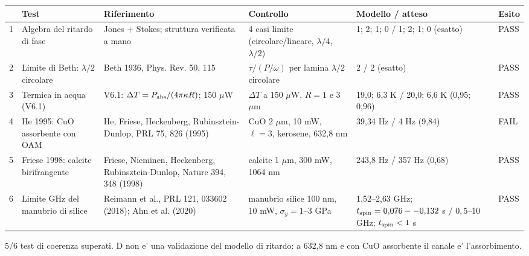 \begin{tabular}{|p{0.3cm}|p{2.4cm}|p{2.7cm}|p{3.5cm}|p{3.75cm}|p{0.85cm}|}
\hline
 & Test & Riferimento & Controllo & Modello / atteso & Esito \\
\hline
1 & Algebra del ritardo di fase & Jones + Stokes; struttura verificata a mano & 4 casi limite (circolare/lineare, $\lambda/4$, $\lambda/2$) & 1; 2; 1; 0 / 1; 2; 1; 0 (esatto) & PASS \\
\hline
2 & Limite di Beth: $\lambda/2$ circolare & Beth 1936, Phys. Rev. 50, 115 & $\tau/(P/\omega)$ per lamina $\lambda/2$ circolare & 2 / 2 (esatto) & PASS \\
\hline
3 & Termica in acqua (V6.1) & V6.1: $\Delta T=P_{\rm abs}/(4\pi\kappa R)$; 150 $\mu$W & $\Delta T$ a 150 $\mu$W, $R=1$ e 3 $\mu$m & 19{,}0; 6{,}3 K / 20{,}0; 6{,}6 K (0{,}95; 0{,}96) & PASS \\
\hline
4 & He 1995: CuO assorbente con OAM & He, Friese, Heckenberg, Rubinsztein-Dunlop, PRL 75, 826 (1995) & CuO 2 $\mu$m, 10 mW, $\ell=3$, kerosene, 632,8 nm & 39{,}34 Hz / 4 Hz (9{,}84) & FAIL \\
\hline
5 & Friese 1998: calcite birifrangente & Friese, Nieminen, Heckenberg, Rubinsztein-Dunlop, Nature 394, 348 (1998) & calcite 1 $\mu$m, 300 mW, 1064 nm & 243{,}8 Hz / 357 Hz (0{,}68) & PASS \\
\hline
6 & Limite GHz del manubrio di silice & Reimann et al., PRL 121, 033602 (2018); Ahn et al. (2020) & manubrio silice 100 nm, 10 mW, $\sigma_y=1$--3 GPa & 1{,}52--2{,}63 GHz; $t_{\rm spin}=0{,}076--0{,}132$ s / $0{,}5$--10 GHz; $t_{\rm spin}<1$ s & PASS \\
\hline
\end{tabular}

\par\smallskip\noindent\footnotesize 5/6 test di coerenza superati. D non e' una validazione del modello di ritardo: a 632,8 nm e con CuO assorbente il canale e' l'assorbimento.
